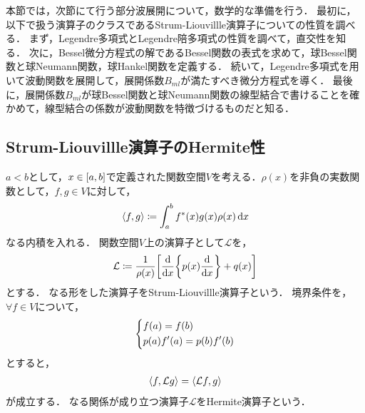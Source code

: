 \documentclass{report}
\begin{document}
  本節では，次節にて行う部分波展開について，数学的な準備を行う．
  最初に，以下で扱う演算子のクラスであるStrum-Liouvillle演算子についての性質を調べる．
  まず，Legendre多項式とLegendre陪多項式の性質を調べて，直交性を知る．
  次に，Bessel微分方程式の解であるBessel関数の表式を求めて，球Bessel関数と球Neumann関数，球Hankel関数を定義する．
  続いて，Legendre多項式を用いて波動関数を展開して，展開係数$B_{ml}$が満たすべき微分方程式を導く．
  最後に，展開係数$B_{ml}$が球Bessel関数と球Neumann関数の線型結合で書けることを確かめて，線型結合の係数が波動関数を特徴づけるものだと知る．
  \subsection{Strum-Liouvillle演算子のHermite性}
    $a < b$として，$x\in \qty[a, b]$で定義された関数空間$V$を考える．$\rho(x)$を非負の実数関数として，$f, g\in V$に対して，
    \begin{align}
      \left\langle f, g \right\rangle \coloneqq \int_{a}^{b} f^*(x)g(x)\rho(x)\dd{x}
    \end{align}
    なる内積を入れる．
    関数空間$V$上の演算子として$\mathcal{L}$を，
    \begin{align}
      \mathcal{L} \coloneqq \frac{1}{\rho(x)}\qty[\dv{x}\qty{p(x)\dv{x}} + q(x)]\label{strum-liouville-operator-def}
    \end{align}
    とする．
    なる形をした演算子をStrum-Liouvillle演算子という．
    境界条件を，$\forall f \in V$について，
    \begin{align}
      \begin{dcases}
        f(a) = f(b) \\ 
        p(a)f'(a) = p(b)f'(b)
      \end{dcases}
    \end{align}
    とすると，
    \begin{align}
      \left\langle f, \mathcal{L}g \right\rangle = \left\langle \mathcal{L}f, g \right\rangle\label{hermite-def}
    \end{align}
    が成立する．
    なる関係が成り立つ演算子$\mathcal{L}$をHermite演算子という．
\end{document}
